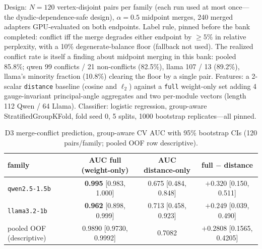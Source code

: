\documentclass{article}
\begin{document}
Design: $N = 120$ vertex-disjoint pairs per family (each run used at most
once---the dyadic-dependence-safe design), $\alpha = 0.5$ midpoint merges,
240 merged adapters GPU-evaluated on both endpoints. Label rule, pinned
before the bank completed: conflict iff the merge degrades either endpoint
by $\ge 5\%$ in relative perplexity, with a 10\% degenerate-balance floor
(fallback not used). The realized conflict rate is itself a finding about
midpoint merging in this bank: pooled 85.8\%; qwen 99 conflicts / 21
non-conflicts (82.5\%), llama 107 / 13 (89.2\%), llama's minority fraction
(10.8\%) clearing the floor by a single pair. Features:
a 2-scalar \texttt{distance} baseline (cosine and $\ell_2$) against a
\texttt{full} weight-only set adding 4 gauge-invariant principal-angle
aggregates and two per-module vectors (length 112 Qwen / 64 Llama).
Classifier: logistic regression, group-aware StratifiedGroupKFold, fold
seed 0, 5 splits, 1000 bootstrap replicates---all pinned.

\begin{table}[ht]
\centering
\small
\caption{D3 merge-conflict prediction, group-aware CV AUC with 95\%
bootstrap CIs (120 pairs/family; pooled OOF row descriptive).}
\label{tab:d3}
\begin{tabular}{lccc}
\toprule
family & AUC full (weight-only) & AUC distance-only & full $-$ distance \\
\midrule
\texttt{qwen2.5-1.5b} & \textbf{0.995} [0.983, 1.000] & 0.675 [0.484, 0.848] & $+0.320$ [0.150, 0.511] \\
\texttt{llama3.2-1b} & \textbf{0.962} [0.898, 0.999] & 0.713 [0.458, 0.923] & $+0.249$ [0.039, 0.490] \\
pooled OOF (descriptive) & 0.9890 [0.9730, 0.9992] & 0.7082 & $+0.2808$ [0.1565, 0.4205] \\
\bottomrule
\end{tabular}
\end{table}
\end{document}
